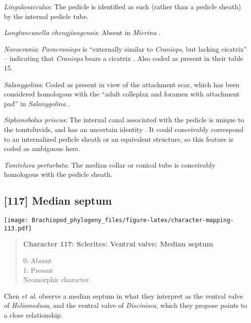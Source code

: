 \documentclass[openany]{book}
\theoremstyle{definition}
\theoremstyle{definition}
\theoremstyle{definition}
\theoremstyle{remark}
\begin{document}
\hypertarget{Lingulosacculus-coding-116}{}
\emph{Lingulosacculus}: The pedicle is identified as such (rather than a
pedicle sheath) by the internal pedicle tube.

\hypertarget{Longtancunella_chengjiangensis-coding-116}{}
\emph{Longtancunella chengjiangensis}: Absent in \emph{Micrina}
\citep{Holmer2011Firstrecord}.

\hypertarget{Novocrania-coding-116}{}
\emph{Novocrania}: \emph{Paracraniops} is ``externally similar to
\emph{Craniops}, but lacking cicatrix'' -- indicating that
\emph{Craniops} bears a cicatrix
\citep{Williams2000LinguliformeaCraniiformea}. Also coded as present in
their table 15.

\hypertarget{Salanygolina-coding-116}{}
\emph{Salanygolina}: Coded as present in view of the attachment scar,
which has been considered homologous with the ``adult colleplax and
foramen with attachment pad'' in \emph{Salanygolina}
\citep{Popov2009Earlyontogeny}.

\hypertarget{Siphonobolus_priscus-coding-116}{}
\emph{Siphonobolus priscus}: The internal canal associated with the
pedicle is unique to the tomteluvids, and has an uncertain identity
\citep{Streng2016Anew}. It could conceivably correspond to an
internalized pedicle sheath or an equivalent structure, so this feature
is coded as ambiguous here.

\hypertarget{Tomteluva_perturbata-coding-116}{}
\emph{Tomteluva perturbata}: The median collar or conical tube is
conceivably homologous with the pedicle sheath.

\subsection*{{[}117{]} Median septum}\label{median-septum}

\texttt{[image: Brachiopod\_phylogeny\_files/figure-latex/character-mapping-113.pdf]}

\begin{quote}
\textbf{Character 117: Sclerites: Ventral valve: Median septum}

0: Absent\\
1: Present\\
Neomorphic character.
\end{quote}

Chen \emph{et al}. \citeyearpar{Chen2007Reinterpretationof} observe a
median septum in what they interpret as the ventral valve of
\emph{Heliomedusa}, and the ventral valve of \emph{Discinisca}, which
they propose points to a close relationship.
\end{document}
